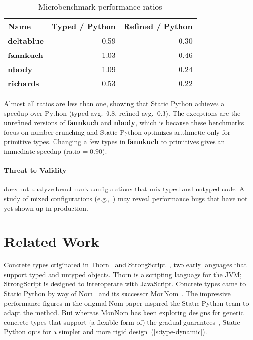 \documentclass[english,cleveref,submission]{programming}
\newcommand{\SP}{Static Python}
\newcommand{\numbenchmark}{3}
\newcommand{\bmname}[1]{\textbf{#1}}
\begin{document}
\begin{table}[t]
  \caption{Microbenchmark performance ratios}
  \label{t:microbenchmark}

  \centering
  \begin{tabular}{lrr}
    Name               & Typed / Python & Refined / Python \\\midrule
    \bmname{deltablue} &         0.59 &           0.30 \\
    \bmname{fannkuch}  &         1.03 &           0.46 \\
    \bmname{nbody}     &         1.09 &           0.24 \\
    \bmname{richards}  &         0.53 &           0.22
  \end{tabular}

\end{table}

Almost all ratios are less than one, showing that \SP{} achieves a speedup over
Python (typed avg.~$0.8$, refined avg.~$0.3$).
The exceptions are the unrefined versions of \bmname{fannkuch} and
\bmname{nbody}, which is because these benchmarks focus
on number-crunching and \SP{} optimizes arithmetic only for primitive types.
Changing a few types in \bmname{fannkuch} to primitives
gives an immediate speedup (ratio = $0.90$).


\paragraph{Threat to Validity}

 does not analyze benchmark configurations that mix
typed and untyped code. %
A study of mixed configurations (e.g.,~\cite{gm-pepm-2018,gtnffvf-jfp-2019})
may reveal performance bugs that have not yet shown up in production.


\section{Related Work}
\label{s:related}

Concrete types originated in Thorn~\cite{bfnorsvw-oopsla-2009,wnlov-popl-2010}
and StrongScript~\cite{rzv-ecoop-2015}, two early languages that support typed
and untyped objects.
Thorn is a scripting language for the JVM; StrongScript is designed to
interoperate with JavaScript.
Concrete types came to \SP{} by way of Nom~\cite{mt-oopsla-2017} and its
successor MonNom~\cite{mt-oopsla-2021}.
The impressive performance figures in the original Nom paper inspired the \SP{}
team to adapt the method.
But whereas MonNom has been exploring designs for generic concrete types that
support (a flexible form of) the gradual guarantees~\cite{svcb-snapl-2015},
\SP{} opts for a simpler and more rigid design~(\cref{s:type-dynamic}).
\end{document}
